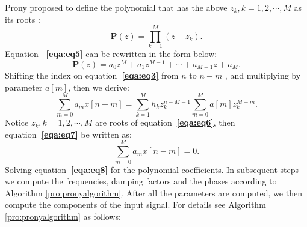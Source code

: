 Prony proposed to define the polynomial that has the 
above $z_k, k=1,2, \cdots , M$ as its roots \cite[]{prony}:
\begin{equation}
    \label{eqa:eq5}
    \mathbf{P}(z)  = \prod_{k=1}^{M}(z-z_k).
\end{equation}
Equation \textbf{~\ref{eqa:eq5}} can be rewritten in the form below:
\begin{equation}
    \label{eqa:eq6}
    \mathbf{P}(z) = a_0 z^M + a_1 z^{M-1} + \cdots + a_{M-1}z + a_M.
\end{equation}
Shifting the index on equation\textbf{~\ref{eqa:eq3}} from $n$ to $n-m$
, and multiplying by parameter $a[m]$, then we derive:
\begin{equation}
    \label{eqa:eq7}
    \sum_{m=0}^{M}a_mx[n-m] = \sum_{k=1}^{M}h_kz_k^{n-M-1}
    \sum_{m=0}^M a[m]z_{k}^{M-m}.
\end{equation}
Notice $z_k, k=1,2,\cdots, M$ are roots of equation\textbf{~\ref{eqa:eq6}},
then equation\textbf{~\ref{eqa:eq7}} be written as:
\begin{equation}
    \label{eqa:eq8}
    \sum_{m=0}^{M}a_mx[n-m] = 0.
\end{equation}
Solving equation\textbf{~\ref{eqa:eq8}} for the polynomial coefficients.
In subsequent steps we compute the frequencies, damping factors 
and the phases according to Algorithm \ref{pro:pronyalgorithm}. 
After all the parameters are computed, we then
compute the components of the input signal. For details see 
Algorithm \ref{pro:pronyalgorithm} as follows:

